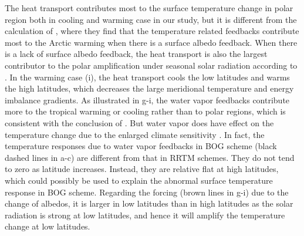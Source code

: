 The heat transport contributes most to the surface temperature change in polar region both in cooling and warming case in our study, but it is different from the calculation of \cite{Pithan2014}, where they find that the temperature related feedbacks contribute most to the Arctic warming when there is a surface albedo feedback. When there is a lack of surface albedo feedback, the heat transport is also the largest contributor to the polar amplification under seasonal solar radiation according to \cite{Kim2018}. In the warming case (i), the heat transport cools the low latitudes and warms the high latitudes, which decreases the large meridional temperature and energy imbalance gradients. As illustrated in g-i, the water vapor feedbacks contribute more to the tropical warming or cooling rather than to polar regions, which is consistent with the conclusion of \cite{Pithan2014}. But water vapor does have effect on the temperature change due to the enlarged climate sensitivity \citep{Langen2012}. In fact, the temperature responses due to water vapor feedbacks in BOG scheme (black dashed lines in a-c) are different from that in RRTM schemes. They do not tend to zero as latitude increases. Instead, they are relative flat at high latitudes, which could possibly be used to explain the abnormal surface temperature response in BOG scheme. Regarding the forcing (brown lines in g-i) due to the change of albedos, it is larger in low latitudes than in high latitudes as the solar radiation is strong at low latitudes, and hence it will amplify the temperature change at low latitudes.


